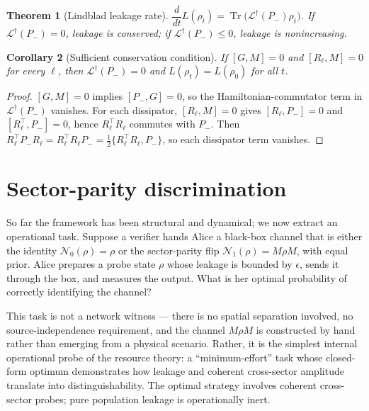\documentclass[a4paper,onecolumn,noarxiv]{quantumarticle}
\theoremstyle{plain}
\newtheorem{theorem}{Theorem}
\newtheorem{corollary}[theorem]{Corollary}
\theoremstyle{definition}
\theoremstyle{remark}
\newcommand{\Pminus}{P_{-}}
\newcommand{\Mop}{M}
\newcommand{\Tr}{\operatorname{Tr}}
\newcommand{\Ldag}{\mathcal{L}^{\dagger}}
\newcommand{\Lleak}{L}
\begin{document}
\begin{theorem}[Lindblad leakage rate]
\label{thm:lindblad}
$\dfrac{d}{dt}\Lleak(\rho_t) = \Tr\bigl(\Ldag(\Pminus)\rho_t\bigr)$. If
$\Ldag(\Pminus)=0$, leakage is conserved; if $\Ldag(\Pminus)\le 0$, leakage is
nonincreasing.
\end{theorem}

\begin{corollary}[Sufficient conservation condition]
\label{cor:lindblad}
If $[G,\Mop]=0$ and $[R_\ell,\Mop]=0$ for every $\ell$, then $\Ldag(\Pminus)=0$
and $\Lleak(\rho_t)=\Lleak(\rho_0)$ for all $t$.
\end{corollary}

\begin{proof}
$[G,\Mop]=0$ implies $[\Pminus,G]=0$, so the Hamiltonian-commutator term in
$\Ldag(\Pminus)$ vanishes. For each dissipator, $[R_\ell,\Mop]=0$ gives
$[R_\ell,\Pminus]=0$ and $[R_\ell^\top,\Pminus]=0$, hence
$R_\ell^\top R_\ell$ commutes with $\Pminus$. Then
$R_\ell^\top\Pminus R_\ell=R_\ell^\top R_\ell\Pminus
=\tfrac{1}{2}\{R_\ell^\top R_\ell,\Pminus\}$, so each dissipator term vanishes.
\end{proof}

\section{Sector-parity discrimination}
\label{sec:discrimination}

So far the framework has been structural and dynamical; we now extract an operational
task. Suppose a verifier hands Alice a black-box channel that is either the identity
$\mathcal{N}_0(\rho)=\rho$ or the sector-parity flip $\mathcal{N}_1(\rho)=\Mop\rho\Mop$,
with equal prior. Alice prepares a probe state $\rho$ whose leakage is bounded by
$\epsilon$, sends it through the box, and measures the output. What is her optimal
probability of correctly identifying the channel?

This task is not a network witness --- there is no spatial separation involved, no
source-independence requirement, and the channel $\Mop\rho\Mop$ is constructed by
hand rather than emerging from a physical scenario. Rather, it is the simplest
internal operational probe of the resource theory: a ``minimum-effort'' task whose
closed-form optimum demonstrates how leakage and coherent cross-sector amplitude
translate into distinguishability. The optimal strategy involves coherent cross-sector
probes; pure population leakage is operationally inert.
\end{document}
